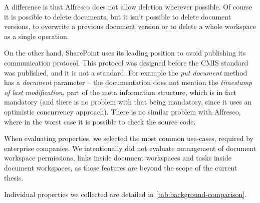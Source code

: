 A difference is that Alfresco does not allow deletion wherever possible. Of course
it is possible to delete documents, but it isn't possible to delete document
versions, to overwrite a previous document version or to delete a whole
workspace as a single operation.

On the other hand, SharePoint uses its leading position to avoid publishing its
communication protocol. This protocol was designed before the CMIS standard was
published, and it is not a standard. For example the \emph{put document} method
has a \emph{document} parameter -- the documentation \cite{spdoc} does not
mention the \emph{timestamp of last modification}, part of the meta information
structure, which is in fact mandatory (and there is no problem with that being
mandatory, since it uses an optimistic concurrency approach). There is no
similar problem with Alfresco, where in the worst case it is possible to check the
source code.

When evaluating properties, we selected the most common use-cases, required by
enterprise companies. We intentionally did not evaluate management of document
workspace permissions, links inside document workspaces and tasks inside
document workspaces, as those features are beyond the scope of the current
thesis.

Individual properties we collected are detailed in
\autoref{tab:background-comparison}.

